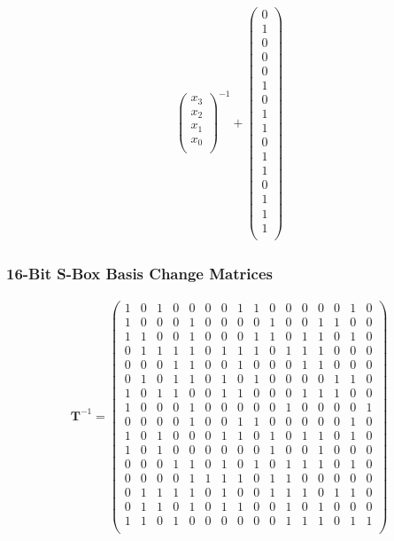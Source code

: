 \documentclass[10pt]{beamer}
\begin{document}
\begin{frame}
\begin{align*}
\begin{pmatrix}
x_{3} \\
x_{2} \\
x_{1} \\
x_{0} \\
\end{pmatrix}^{-1}
+
\begin{pmatrix}
0 \\
1 \\
0 \\
0 \\
0 \\ 
1 \\
0 \\
1 \\
1 \\
0 \\
1 \\
1 \\
0 \\ 
1 \\
1 \\
1 \\
\end{pmatrix}
\end{align*}
\normalsize
\end{frame}

\begin{frame}
	\frametitle{16-Bit S-Box Basis Change Matrices}
\small
\begin{align*}
\mathbf{T}^{-1} = 
\begin{pmatrix}
1 &0 &1 &0 &0 &0 &0 &1 &1 &0 &0 &0 &0 &0 &1 &0\\
1 &0 &0 &0 &1 &0 &0 &0 &0 &1 &0 &0 &1 &1 &0 &0\\
1 &1 &0 &0 &1 &0 &0 &0 &1 &1 &0 &1 &1 &0 &1 &0\\
0 &1 &1 &1 &1 &0 &1 &1 &1 &0 &1 &1 &1 &0 &0 &0\\
0 &0 &0 &1 &1 &0 &0 &1 &0 &0 &0 &1 &1 &0 &0 &0\\
0 &1 &0 &1 &1 &0 &1 &0 &1 &0 &0 &0 &0 &1 &1 &0\\
1 &0 &1 &1 &0 &0 &1 &1 &0 &0 &0 &1 &1 &1 &0 &0\\
1 &0 &0 &0 &1 &0 &0 &0 &0 &0 &1 &0 &0 &0 &0 &1\\
0 &0 &0 &0 &1 &0 &0 &1 &1 &0 &0 &0 &0 &0 &1 &0\\
1 &0 &1 &0 &0 &0 &1 &1 &0 &1 &0 &1 &1 &0 &1 &0\\
1 &0 &1 &0 &0 &0 &0 &0 &0 &1 &0 &0 &1 &0 &0 &0\\
0 &0 &0 &1 &1 &0 &1 &0 &1 &0 &1 &1 &1 &0 &1 &0\\
0 &0 &0 &0 &1 &1 &1 &1 &0 &1 &1 &0 &0 &0 &0 &0\\
0 &1 &1 &1 &1 &0 &1 &0 &0 &1 &1 &1 &0 &1 &1 &0\\
0 &1 &1 &0 &1 &0 &1 &1 &0 &0 &1 &0 &1 &0 &0 &0\\
1 &1 &0 &1 &0 &0 &0 &0 &0 &0 &1 &1 &1 &0 &1 &1\\
\end{pmatrix}
\end{align*}
\normalsize
\end{frame}
\end{document}
